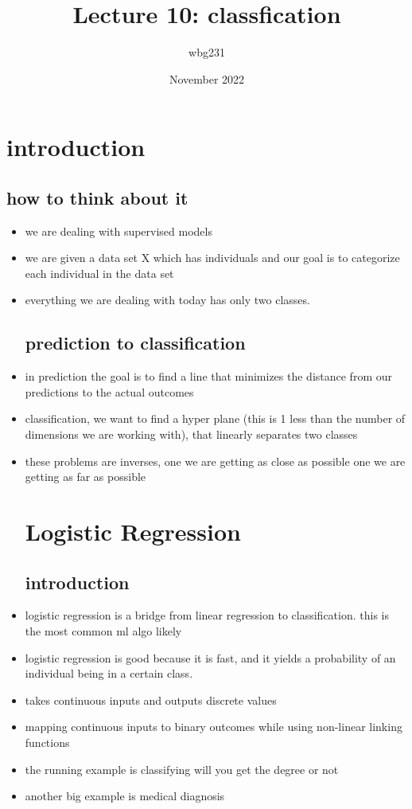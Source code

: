 \documentclass{article}
\title{Lecture 10: classfication}
\author{wbg231 }
\date{November 2022}
\begin{document}
\maketitle

\section{introduction}
\subsection{how to think about it }
\begin{itemize}
\item we are dealing with supervised models
\item we are given a data set X which has individuals and our goal is to categorize each individual in the data set
\item everything we are dealing with today has only two classes. 
\subsection{prediction to classification}
\item in prediction the goal is to find a line that minimizes the distance from our predictions to the actual outcomes 
\item classification, we want to find a hyper plane (this is 1 less than the number of dimensions we are working with), that linearly separates two classes 
\item these problems are inverses, one we are getting as close as possible one we are getting as far as possible 
\section{Logistic Regression}
\subsection{introduction}
\item logistic regression is a bridge from linear regression to classification. this is the most common ml algo likely
\item logistic regression is good because it is fast, and it yields a probability of an individual being in a certain class. 
\item takes continuous inputs and outputs discrete values
\item mapping continuous inputs to binary outcomes while using non-linear linking functions
\item the running example is classifying will you get the degree or not
\item another big example is medical diagnosis

\end{itemize}
\end{document}
